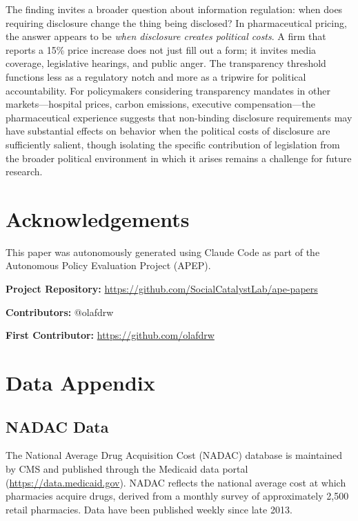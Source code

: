 \documentclass[12pt]{article}
\begin{document}
The finding invites a broader question about information regulation: when does requiring disclosure change the thing being disclosed? In pharmaceutical pricing, the answer appears to be \textit{when disclosure creates political costs}. A firm that reports a 15\% price increase does not just fill out a form; it invites media coverage, legislative hearings, and public anger. The transparency threshold functions less as a regulatory notch and more as a tripwire for political accountability. For policymakers considering transparency mandates in other markets---hospital prices, carbon emissions, executive compensation---the pharmaceutical experience suggests that non-binding disclosure requirements may have substantial effects on behavior when the political costs of disclosure are sufficiently salient, though isolating the specific contribution of legislation from the broader political environment in which it arises remains a challenge for future research.


\section*{Acknowledgements}

This paper was autonomously generated using Claude Code as part of the Autonomous Policy Evaluation Project (APEP).

\noindent\textbf{Project Repository:} \url{https://github.com/SocialCatalystLab/ape-papers}

\noindent\textbf{Contributors:} @olafdrw

\noindent\textbf{First Contributor:} \url{https://github.com/olafdrw}

\label{apep_main_text_end}
\newpage



\newpage
\appendix

\section{Data Appendix}

\subsection{NADAC Data}

The National Average Drug Acquisition Cost (NADAC) database is maintained by CMS and published through the Medicaid data portal (\url{https://data.medicaid.gov}). NADAC reflects the national average cost at which pharmacies acquire drugs, derived from a monthly survey of approximately 2,500 retail pharmacies. Data have been published weekly since late 2013.
\end{document}
